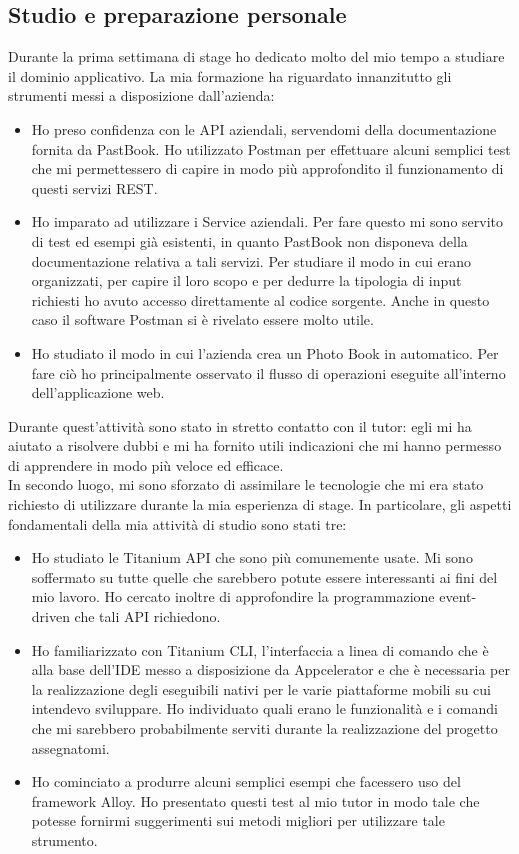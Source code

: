 		\subsection{Studio e preparazione personale}
			Durante la prima settimana di stage ho dedicato molto del mio tempo a studiare il dominio applicativo. La mia formazione ha
			riguardato innanzitutto gli strumenti messi a disposizione dall'azienda:
			\begin{itemize}
				\item Ho preso confidenza con le API aziendali, servendomi della documentazione fornita da PastBook. Ho utilizzato
				Postman per effettuare alcuni semplici test che mi permettessero di capire in
				modo più approfondito il funzionamento di questi servizi REST.
				\item Ho imparato ad utilizzare i Service aziendali. Per fare questo mi sono servito di test ed esempi già
				esistenti, in quanto PastBook non disponeva della documentazione relativa a tali servizi. Per studiare il modo in cui
				erano organizzati, per capire il loro scopo e per dedurre la tipologia di input richiesti ho avuto accesso
				direttamente al codice sorgente. Anche in questo caso il software Postman si è rivelato essere molto utile.
				\item Ho studiato il modo in cui l'azienda crea un Photo Book in automatico. Per fare ciò ho principalmente
				osservato il flusso di operazioni eseguite all'interno dell'applicazione web.
			\end{itemize}
			Durante quest'attività sono stato in stretto contatto con il tutor: egli mi ha aiutato a risolvere dubbi e mi ha fornito
			utili indicazioni che mi hanno permesso di apprendere in modo più veloce ed efficace.\\
			In secondo luogo, mi sono sforzato di assimilare le tecnologie che mi era stato richiesto di utilizzare durante la mia
			esperienza di stage. In particolare, gli aspetti fondamentali della mia attività di studio sono stati tre:
			\begin{itemize}
				\item Ho studiato le Titanium API che sono più comunemente usate. Mi sono soffermato su tutte quelle che sarebbero
				potute essere interessanti ai fini del mio lavoro. Ho cercato inoltre di approfondire la programmazione event-driven
				che tali API richiedono.
				\item Ho familiarizzato con Titanium CLI, l'interfaccia a linea di comando che è alla base dell'IDE messo a
				disposizione da Appcelerator e che è necessaria per la realizzazione degli eseguibili nativi per le varie piattaforme
				mobili su cui intendevo sviluppare. Ho individuato quali erano le funzionalità e i comandi che mi sarebbero
				probabilmente serviti durante la realizzazione del progetto assegnatomi.
				\item Ho cominciato a produrre alcuni semplici esempi che facessero uso del framework Alloy. Ho presentato questi
				test al mio tutor in modo tale che potesse fornirmi suggerimenti sui metodi migliori per utilizzare tale strumento.
			\end{itemize}
